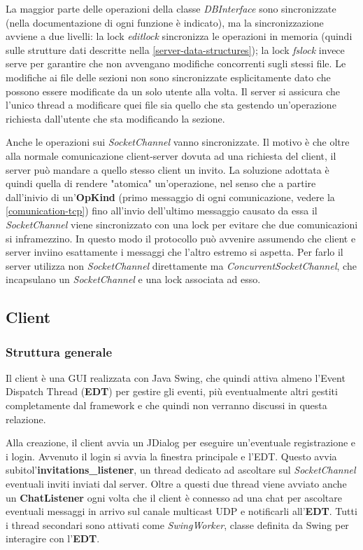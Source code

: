 \documentclass[a4paper]{article}
\theoremstyle{theorem}
\theoremstyle{remark}
\theoremstyle{definition}
\theoremstyle{corollary}
\theoremstyle{lemma}
\begin{document}
La maggior parte delle operazioni della classe \textit{DBInterface} sono sincronizzate (nella documentazione di ogni funzione è indicato), ma la sincronizzazione avviene a due livelli: la lock \textit{editlock} sincronizza le operazioni in memoria (quindi sulle strutture dati descritte nella \autoref{server-data-structures}); la lock \textit{fslock} invece serve per garantire che non avvengano modifiche concorrenti sugli stessi file. Le modifiche ai file delle sezioni non sono sincronizzate esplicitamente dato che possono essere modificate da un solo utente alla volta. Il server si assicura che l'unico thread a modificare quei file sia quello che sta gestendo un'operazione richiesta dall'utente che sta modificando la sezione.

Anche le operazioni sui \textit{SocketChannel} vanno sincronizzate. Il motivo è che oltre alla normale comunicazione client-server dovuta ad una richiesta del client, il server può mandare a quello stesso client un invito. La soluzione adottata è quindi quella di rendere "atomica" un'operazione, nel senso che a partire dall'inivio di un'\textbf{OpKind} (primo messaggio di ogni comunicazione, vedere la \autoref{comunication-tcp}) fino all'invio dell'ultimo messaggio causato da essa il \textit{SocketChannel} viene sincronizzato con una lock per evitare che due comunicazioni si inframezzino. In questo modo il protocollo può avvenire assumendo che client e server inviino esattamente i messaggi che l'altro estremo si aspetta. Per farlo il server utilizza non \textit{SocketChannel} direttamente ma \textit{ConcurrentSocketChannel}, che incapsulano un \textit{SocketChannel} e una lock associata ad esso.

\subsection{Client}
\subsubsection{Struttura generale}
Il client è una GUI realizzata con Java Swing, che quindi attiva almeno l'Event Dispatch Thread (\textbf{EDT}) per gestire gli eventi, più eventualmente altri gestiti completamente dal framework e che quindi non verranno discussi in questa relazione.

Alla creazione, il client avvia un JDialog per eseguire un'eventuale registrazione e i login. Avvenuto il login si avvia la finestra principale e l'EDT. Questo avvia subitol'\textbf{invitations\_listener}, un thread dedicato ad ascoltare sul \textit{SocketChannel} eventuali inviti inviati dal server. Oltre a questi due thread viene avviato anche un \textbf{ChatListener} ogni volta che il client è connesso ad una chat per ascoltare eventuali messaggi in arrivo sul canale multicast UDP e notificarli all'\textbf{EDT}. Tutti i thread secondari sono attivati come \textit{SwingWorker}, classe definita da Swing per interagire con l'\textbf{EDT}.
\end{document}

